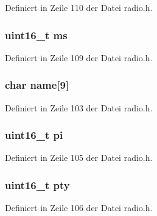 Definiert in Zeile 110 der Datei radio.\+h.

\hypertarget{structradio__rds_a8d03256977e8f265177523adc9bab6c0}{}
\subsubsection[{ms}]{\setlength{\rightskip}{0pt plus 5cm}uint16\+\_\+t ms}\label{structradio__rds_a8d03256977e8f265177523adc9bab6c0}


Definiert in Zeile 109 der Datei radio.\+h.

\hypertarget{structradio__rds_a00c5e915306c0baea463b99ba6c09c4f}{}
\subsubsection[{name}]{\setlength{\rightskip}{0pt plus 5cm}char name\mbox{[}9\mbox{]}}\label{structradio__rds_a00c5e915306c0baea463b99ba6c09c4f}


Definiert in Zeile 103 der Datei radio.\+h.

\hypertarget{structradio__rds_ad1803744db28ac0d226ec8da9134598e}{}
\subsubsection[{pi}]{\setlength{\rightskip}{0pt plus 5cm}uint16\+\_\+t pi}\label{structradio__rds_ad1803744db28ac0d226ec8da9134598e}


Definiert in Zeile 105 der Datei radio.\+h.

\hypertarget{structradio__rds_a6a555813c441b0e0dce51020817fa68e}{}
\subsubsection[{pty}]{\setlength{\rightskip}{0pt plus 5cm}uint16\+\_\+t pty}\label{structradio__rds_a6a555813c441b0e0dce51020817fa68e}


Definiert in Zeile 106 der Datei radio.\+h.

\hypertarget{structradio__rds_aaa7c4cc5a934d489d475d0f7d26e437c}{}
